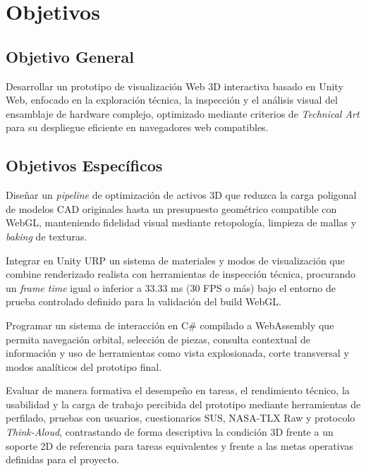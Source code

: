 \section{Objetivos}

\subsection{Objetivo General}
Desarrollar un prototipo de visualizaci\'on Web 3D interactiva basado en Unity Web, enfocado en la exploraci\'on t\'ecnica, la inspecci\'on y el an\'alisis visual del ensamblaje de hardware complejo, optimizado mediante criterios de \textit{Technical Art} para su despliegue eficiente en navegadores web compatibles.

\subsection{Objetivos Espec\'ificos}

Dise\~nar un \textit{pipeline} de optimizaci\'on de activos 3D que reduzca la carga poligonal de modelos CAD originales hasta un presupuesto geom\'etrico compatible con WebGL, manteniendo fidelidad visual mediante retopolog\'ia, limpieza de mallas y \textit{baking} de texturas.

Integrar en Unity URP un sistema de materiales y modos de visualizaci\'on que combine renderizado realista con herramientas de inspecci\'on t\'ecnica, procurando un \textit{frame time} igual o inferior a 33.33 ms (30 FPS o m\'as) bajo el entorno de prueba controlado definido para la validaci\'on del build WebGL.

Programar un sistema de interacci\'on en C\# compilado a WebAssembly que permita navegaci\'on orbital, selecci\'on de piezas, consulta contextual de informaci\'on y uso de herramientas como vista explosionada, corte transversal y modos anal\'iticos del prototipo final.

Evaluar de manera formativa el desempe\~no en tareas, el rendimiento t\'ecnico, la usabilidad y la carga de trabajo percibida del prototipo mediante herramientas de perfilado, pruebas con usuarios, cuestionarios SUS, NASA-TLX Raw y protocolo \textit{Think-Aloud}, contrastando de forma descriptiva la condici\'on 3D frente a un soporte 2D de referencia para tareas equivalentes y frente a las metas operativas definidas para el proyecto.

\newpage

